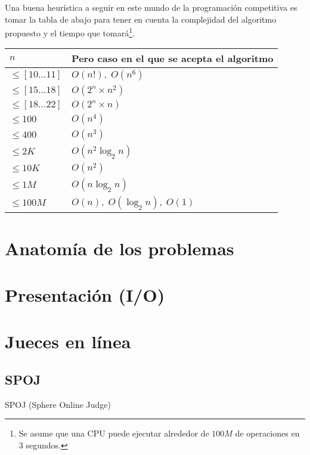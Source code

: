 Una buena heurística a seguir en este mundo de la programación competitiva es tomar la tabla de
abajo para tener en cuenta la complejidad del algoritmo propuesto y el tiempo que tomará\footnote{
    Se asume que una CPU puede ejecutar alrededor de $100M$ de operaciones en 3 segundos.
}.
\begin{table}[H]
\centering
\begin{tabular}{l|l}
\hline
$n$                   & Pero caso en el que se acepta el algoritmo  \\ \hline
$\leq [10 \ldots 11]$ & $O(n!), \; O(n^6)$                          \\
$\leq [15 \ldots 18]$ & $O(2^n \times n^2)$                         \\
$\leq [18 \ldots 22]$ & $O(2^n \times n)$                           \\
$\leq 100$            & $O(n^4)$                                    \\
$\leq 400$            & $O(n^3)$                                    \\
$\leq 2K$             & $O(n^2 \log_2 n)$                           \\
$\leq 10K$            & $O(n^2)$                                    \\
$\leq 1M$             & $O(n \log_2 n)$                             \\
$\leq 100M$           & $O(n), \; O(\log_2 n), \; O(1)$             \\ \hline
\end{tabular}
\end{table}

\section{Anatomía de los problemas}


\section{Presentación (I/O)}


\section{Jueces en línea}

 
\subsection{\selectfont SPOJ}
SPOJ (Sphere Online Judge)

